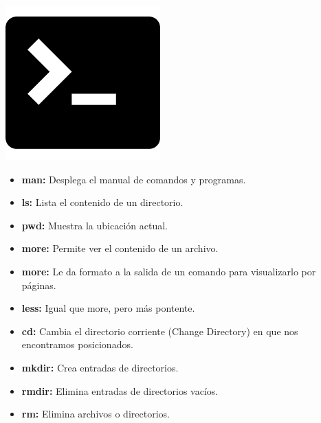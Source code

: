\documentclass[10pt,xcolor={dvipsnames}]{beamer}
\begin{document}
\begin{frame}
\begin{center}
\includegraphics[scale=0.2]{Figures/terminal}
\end{center}
\begin{itemize}
\item<2-|alert@2> \textbf{man:} Desplega el manual de comandos y programas.
\item<3-|alert@3> \textbf{ls:} Lista el contenido de un directorio.
\item<4-|alert@4> \textbf{pwd:} Muestra la ubicación actual.
\item<5-|alert@5> \textbf{more:} Permite ver el contenido de un archivo.
\item<6-|alert@6> \textbf{more:} Le da formato a la salida de un comando para visualizarlo por páginas.
\item<7-|alert@7> \textbf{less:} Igual que more, pero más pontente.
\item<8-|alert@8> \textbf{cd:} Cambia el directorio corriente (Change Directory) en que nos encontramos posicionados.
\item<9-|alert@9> \textbf{mkdir:} Crea entradas de directorios.
\item<10-|alert@10> \textbf{rmdir:} Elimina entradas de directorios vacíos.
\item<11-|alert@11> \textbf{rm:} Elimina archivos o directorios.
\end{itemize}
\end{frame}
\end{document}
